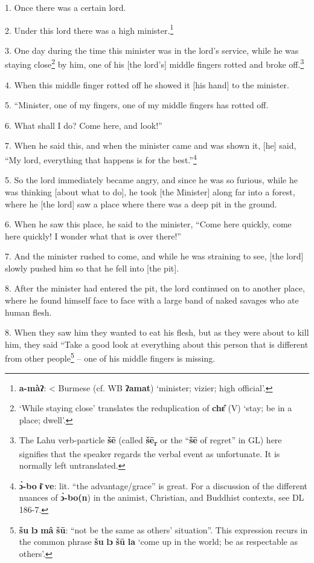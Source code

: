 \setcounter{footnote}{0}

1. Once there was a certain lord.

2. Under this lord there was a high minister.\footnote{\textbf{a-màʔ}: < Burmese (cf. WB \textbf{ʔamat}) `minister; vizier; high official'.}

3. One day during the time this minister was in the lord's service, while he was
staying close\footnote{`While staying close' translates the reduplication of \textbf{chɛ̂} (V) `stay; be in a place; dwell'.} by him, one of his [the lord's] middle fingers rotted and broke off.\footnote{The Lahu verb-particle \textbf{šē} (called \textbf{šē\textsubscript{r}} or the ``\textbf{šē} of regret'' in GL) here signifies that the speaker regards the verbal event as unfortunate. It is normally left untranslated.}

4. When this middle finger rotted off he showed it [his hand] to the minister.

5. ``Minister, one of my fingers, one of my middle fingers has rotted off.

6. What shall I do? Come here, and look!''

7. When he said this, and when the minister came and was shown it, [he] said, ``My
lord, everything that happens is for the best.''\footnote{\textbf{ɔ̀-bo} \textbf{ɨ̄} \textbf{ve}: lit. ``the advantage/grace'' is great. For a discussion of the different nuances of \textbf{ɔ̀-bo(n}) in the animist, Christian, and Buddhist contexts, see DL 186-7.}

5. So the lord immediately became angry, and since he was so furious, while he
was thinking [about what to do], he took [the Minister] along far into a forest, where he [the lord] saw a place
where there was a deep pit in the ground.

6. When he saw this place, he said to the minister, ``Come here quickly, come here
quickly! I wonder what that is over there!''

7. And the minister rushed to come, and while he was straining to see, [the lord]
slowly pushed him so that he fell into [the pit].

8. After the minister had entered the pit, the lord continued on to another place,
where he found himself face to face with a large band of naked savages who ate
human flesh.

8. When they saw him they wanted to eat his flesh, but as they were about to kill
him, they said ``Take a good look at everything about this person that is different from other people\footnote{\textbf{šu} \textbf{lɔ} \textbf{mâ} \textbf{šū}: ``not be the same as others' situation''. This expression recurs in the common phrase \textbf{šu} \textbf{lɔ} \textbf{šū} \textbf{la} `come up in the world; be as respectable as others'.} --
one of his middle fingers is missing.

